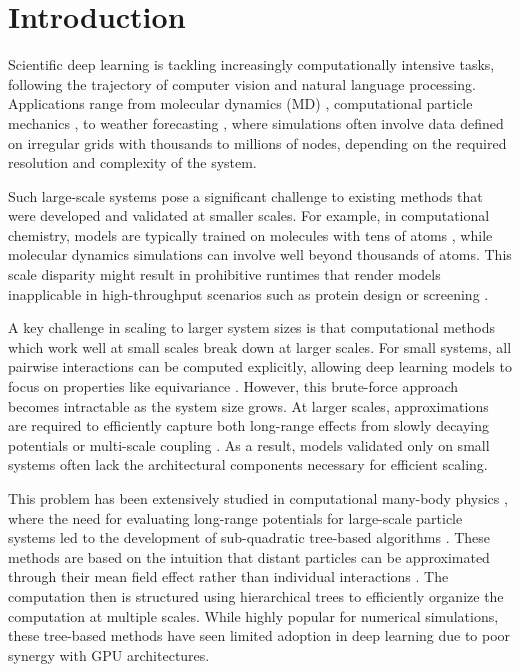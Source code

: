 \section{Introduction}

Scientific deep learning is tackling increasingly computationally intensive tasks, following the trajectory of computer vision and natural language processing. Applications range from molecular dynamics (MD) \cite{Arts2023TwoFO}, computational particle mechanics \cite{alkin2024neuraldemrealtimesimulation}, to weather forecasting \cite{bodnar2024aurora}, where simulations often involve data defined on irregular grids with thousands to millions of nodes, depending on the required resolution and complexity of the system.
\vspace{+5pt}

Such large-scale systems pose a significant challenge to existing methods that were developed and validated at smaller scales. For example, in computational chemistry, models are typically trained on molecules with tens of atoms \cite{Kovacs2023MACEOFF23TM}, while molecular dynamics simulations can involve well beyond thousands of atoms. This scale disparity might result in prohibitive runtimes that render models inapplicable in high-throughput scenarios such as protein design \cite{Watson2023DeND} or screening \cite{Fu2022SimulateTC}.

A key challenge in scaling to larger system sizes is that computational methods which work well at small scales break down at larger scales.
For small systems, all pairwise interactions can be computed explicitly, allowing deep learning models to focus on properties like equivariance \cite{Cohen2016GroupEC}. However, this brute-force approach becomes intractable as the system size grows. At larger scales, approximations are required to efficiently capture both long-range effects from slowly decaying potentials or multi-scale coupling \cite{Majumdar2020MultiscaleFO}. As a result, models validated only on small systems often lack the architectural components necessary for efficient scaling. %

This problem has been extensively studied in computational many-body physics \cite{Hockney1966ComputerSU}, where the need for evaluating long-range potentials for large-scale particle systems led to the development of sub-quadratic tree-based algorithms \cite{1986Natur.324..446B, doi:10.1137/0909044}. These methods are based on the intuition that distant particles can be approximated through their mean field effect rather than individual interactions \cite{Pfalzner1996ManybodyTM}. The computation then is structured using hierarchical trees to efficiently organize the computation at multiple scales. While highly popular for numerical simulations, these tree-based methods have seen limited adoption in deep learning due to poor synergy with GPU architectures.

